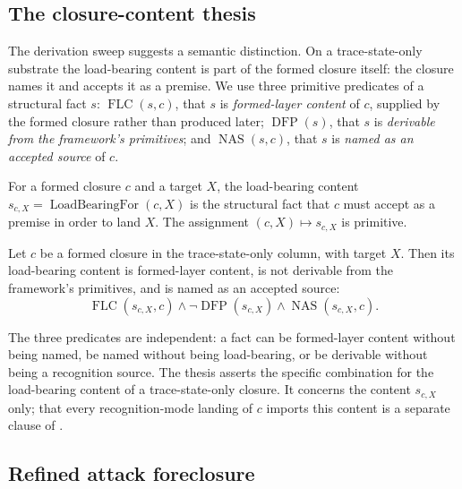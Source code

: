

\subsection{The closure-content thesis}\label{sec:recognition:closure-content-thesis}

The derivation sweep suggests a semantic distinction.  On a
trace-state-only substrate the load-bearing content is part of the
formed closure itself: the closure names it and accepts it as a
premise.  We use three primitive predicates of a structural fact
\(s\): \(\operatorname{FLC}(s,c)\), that \(s\) is \emph{formed-layer
content} of \(c\), supplied by the formed closure rather than produced
later; \(\operatorname{DFP}(s)\), that \(s\) is \emph{derivable from
the framework's primitives}; and \(\operatorname{NAS}(s,c)\), that \(s\)
is \emph{named as an accepted source} of \(c\).

\begin{definition}\label{def:load-bearing}
For a formed closure \(c\) and a target \(X\), the load-bearing content
\(s_{c,X}=\operatorname{LoadBearingFor}(c,X)\) is the structural fact
that \(c\) must accept as a premise in order to land \(X\).  The
assignment \((c,X)\mapsto s_{c,X}\) is primitive.
\end{definition}

\begin{schema}\label{thm:closure-content-thesis}
Let \(c\) be a formed closure in the trace-state-only column, with
target \(X\).  Then its load-bearing content is formed-layer content,
is not derivable from the framework's primitives, and is named as an
accepted source:
\[
  \operatorname{FLC}(s_{c,X},c)\wedge
  \neg\operatorname{DFP}(s_{c,X})\wedge
  \operatorname{NAS}(s_{c,X},c).
\]
\end{schema}

The three predicates are independent: a fact can be formed-layer
content without being named, be named without being load-bearing, or be
derivable without being a recognition source.  The thesis asserts the
specific combination for the load-bearing content of a trace-state-only
closure.  It concerns the content \(s_{c,X}\) only; that every
recognition-mode landing of \(c\) imports this content is a separate
clause of .

\subsection{Refined attack foreclosure}\label{sec:recognition:attack-foreclosure-v5}

